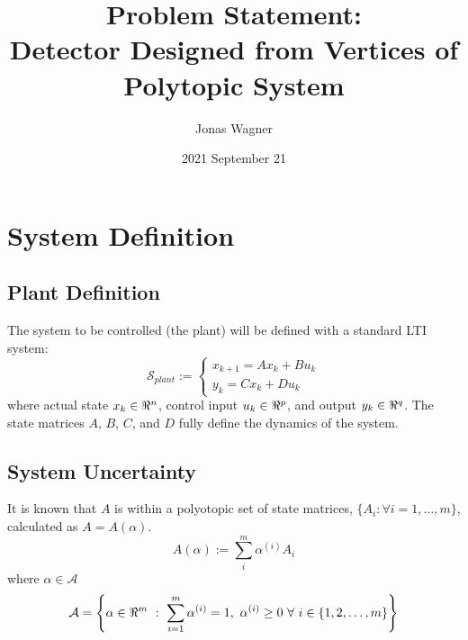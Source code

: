 \documentclass[]{article}
\title{Problem Statement:\\
Detector Designed from Vertices of Polytopic System}
\author{Jonas Wagner}
\date{2021 September 21}
\begin{document}
\maketitle
%



\section{System Definition}
\subsection{Plant Definition}
The system to be controlled (the plant) will be defined with a standard LTI system:
\begin{equation}\label{eq:plant_def}
    \mathcal{S}_{plant} :=
    \begin{cases}
        x_{k+1} = A x_k + B u_k\\
        y_{k} = C x_k + D u_k
    \end{cases}
\end{equation}
where actual state $x_k \in \real^n$, control input $u_k \in \real^p$, 
and output $y_k \in \real^q$. 
The state matrices $A$, $B$, $C$, and $D$ fully define the dynamics of the system.\\

\subsection{System Uncertainty}
It is known that $A$ is within a polyotopic set of state matrices, 
$\{A_i : \forall i = 1,\dots,m\}$, calculated as $A = A(\alpha)$.\\
\begin{equation}\label{eq:}
    A(\alpha) := \sum_i^m \alpha^{(i)} A_i
\end{equation}
where $\alpha \in \mathcal{A}$
\begin{equation}\label{eq:alpha_set}
	\mathcal{A} = 
        \qty{
            \alpha\in \real^m \ : \ 
            \sum_{i=1}^m \alpha^{(i)} = 1, \
            \alpha^{(i)}\geq 0 \ \forall \ i \in \qty{1,2,\dots,m}
        }
\end{equation}
\end{document}
